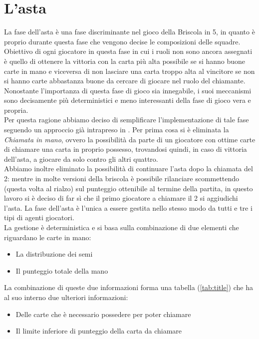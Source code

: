 \section{L'asta}

La fase dell'asta è una fase discriminante nel gioco della Briscola in 5, in quanto è proprio durante questa fase che vengono decise le composizioni delle squadre.\\
Obiettivo di ogni giocatore in questa fase in cui i ruoli non sono ancora assegnati è quello di ottenere la vittoria con la carta più alta possibile se si hanno buone carte in mano e viceversa di non lasciare una carta troppo alta al vincitore se non si hanno carte abbastanza buone da cercare di giocare nel ruolo del chiamante.\\
Nonostante l'importanza di questa fase di gioco sia innegabile, i suoi meccanismi sono decisamente più deterministici e meno interessanti della fase di gioco vera e propria.\\
Per questa ragione abbiamo deciso di semplificare l'implementazione di tale fase seguendo un approccio già intrapreso in \cite{villa}.
Per prima cosa si è eliminata la \emph{Chiamata in mano}, ovvero la possibilità da parte di un giocatore con ottime carte di chiamare una carta in proprio possesso, trovandosi quindi, in caso di vittoria dell'asta, a giocare da solo contro gli altri quattro.\\
Abbiamo inoltre eliminato la possibilità di continuare l'asta dopo la chiamata del 2: mentre in molte versioni della briscola è possibile rilanciare scommettendo (questa volta al rialzo) sul punteggio ottenibile al termine della partita, in questo lavoro si è deciso di far sì che il primo giocatore a chiamare il 2 si aggiudichi l'asta.
La fase dell'asta è l'unica a essere gestita nello stesso modo da tutti e tre i tipi di agenti giocatori.\\
La gestione è deterministica e si basa sulla combinazione di due elementi che riguardano le carte in mano:
\begin{itemize}
   \item La distribuzione dei semi
   \item Il punteggio totale della mano
\end{itemize}
La combinazione di queste due informazioni forma una tabella (\ref{tab:title}) che ha al suo interno due ulteriori informazioni:
\begin{itemize}
   \item Delle carte che è necessario possedere per poter chiamare
   \item Il limite inferiore di punteggio della carta da chiamare 
\end{itemize}


